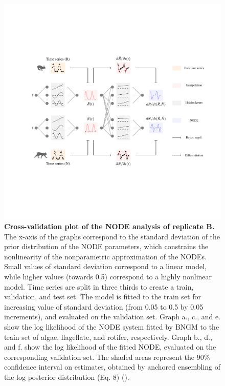 \documentclass[11pt, oneside]{article}
\begin{document}
\newpage
\begin{figure}[H]
\includegraphics[width=1\linewidth,page=18]{figures/main.pdf}
\caption{
    \textbf{Cross-validation plot of the NODE analysis of replicate B.}
    The x-axis of the graphs correspond to the standard deviation of the prior distribution of the NODE parameters, which constrains the nonlinearity of the nonparametric approximation of the NODEs.
    Small values of standard deviation correspond to a linear model, while higher values (towards 0.5) correspond to a highly nonlinear model.
    Time series are split in three thirds to create a train, validation, and test set. 
    The model is fitted to the train set for increasing value of standard deviation (from 0.05 to 0.5 by 0.05 increments), and evaluated on the validation set.
    Graph a., c., and e. show the log likelihood of the NODE system fitted by BNGM to the train set of algae, flagellate, and rotifer, respectively.
    Graph b., d., and f. show the log likelihood of the fitted NODE, evaluated on the corresponding validation set.
    The shaded areas represent the 90\% confidence interval on estimates, obtained by anchored ensembling of the log posterior distribution (Eq. 8) (\cite{Pearce2018}).
}
\end{figure}
\newpage
\end{document}
